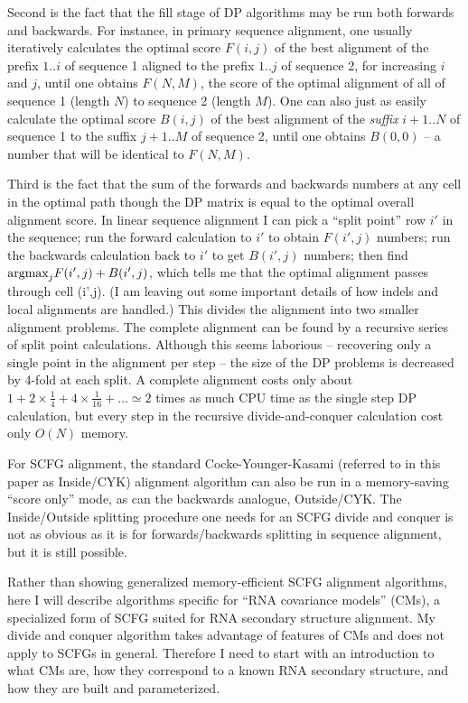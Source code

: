 \documentclass[11pt]{article}
\begin{document}
Second is the fact that the fill stage of DP algorithms may be run
both forwards and backwards. For instance, in primary sequence
alignment, one usually iteratively calculates the optimal score
$F(i,j)$ of the best alignment of the prefix $1..i$ of sequence 1
aligned to the prefix $1..j$ of sequence 2, for increasing $i$ and
$j$, until one obtains $F(N,M)$, the score of the optimal alignment of
all of sequence 1 (length $N$) to sequence 2 (length $M$). One can
also just as easily calculate the optimal score $B(i,j)$ of the best
alignment of the
\emph{suffix} $i+1..N$ of sequence 1 to the suffix $j+1..M$ of sequence 2,
until one obtains $B(0,0)$ -- a number that will be identical to
$F(N,M)$.

Third is the fact that the sum of the forwards and backwards numbers
at any cell in the optimal path though the DP matrix is equal to the
optimal overall alignment score. In linear sequence alignment I can
pick a ``split point'' row $i'$ in the sequence; run the forward
calculation to $i'$ to obtain $F(i',j)$ numbers; run the backwards
calculation back to $i'$ to get $B(i',j)$ numbers; then find
$\mbox{\rm{argmax}}_j F(i',j) + B(i',j)$, which tells me that the optimal
alignment passes through cell (i',j). (I am leaving out some important
details of how indels and local alignments are handled.) This divides
the alignment into two smaller alignment problems. The complete
alignment can be found by a recursive series of split point
calculations. Although this seems laborious -- recovering only a
single point in the alignment per step -- the size of the DP problems
is decreased by 4-fold at each split. A complete alignment costs only
about $1 + 2 \times \frac{1}{4} + 4 \times \frac{1}{16} + \ldots
\simeq 2$ times as much CPU time as the single step DP calculation,
but every step in the recursive divide-and-conquer calculation cost
only $O(N)$ memory.

For SCFG alignment, the standard Cocke-Younger-Kasami (referred to in
this paper as Inside/CYK) alignment algorithm can also be run in a
memory-saving ``score only'' mode, as can the backwards analogue,
Outside/CYK. The Inside/Outside splitting procedure one needs for an
SCFG divide and conquer is not as obvious as it is for
forwards/backwards splitting in sequence alignment, but it is still
possible.

Rather than showing generalized memory-efficient SCFG alignment
algorithms, here I will describe algorithms specific for ``RNA
covariance models'' (CMs), a specialized form of SCFG suited for RNA
secondary structure alignment. My divide and conquer algorithm takes
advantage of features of CMs and does not apply to SCFGs in
general. Therefore I need to start with an introduction to what CMs
are, how they correspond to a known RNA secondary structure, and how
they are built and parameterized.
      
\end{document}
